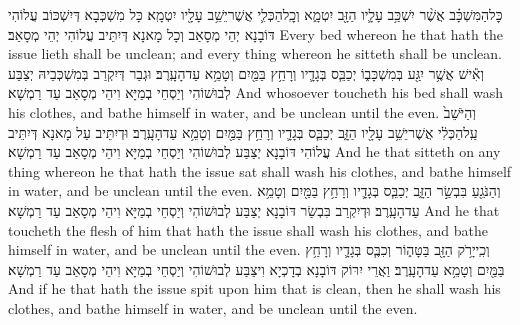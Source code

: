 {כׇּל\maqqaf הַמִּשְׁכָּ֗ב אֲשֶׁ֨ר יִשְׁכַּ֥ב עָלָ֛יו הַזָּ֖ב יִטְמָ֑א וְכׇֽל\maqqaf הַכְּלִ֛י אֲשֶׁר\maqqaf יֵשֵׁ֥ב עָלָ֖יו יִטְמָֽא׃}
{כָּל מִשְׁכְּבָא דְּיִשְׁכּוֹב עֲלוֹהִי דּוֹבָנָא יְהֵי מְסָאַב וְכָל מָאנָא דְּיִתֵּיב עֲלוֹהִי יְהֵי מְסָאַב׃}
{Every bed whereon he that hath the issue lieth shall be unclean; and every thing whereon he sitteth shall be unclean.}{}
{וְאִ֕ישׁ אֲשֶׁ֥ר יִגַּ֖ע בְּמִשְׁכָּב֑וֹ יְכַבֵּ֧ס בְּגָדָ֛יו וְרָחַ֥ץ בַּמַּ֖יִם וְטָמֵ֥א עַד\maqqaf הָעָֽרֶב׃}
{וּגְבַר דְּיִקְרַב בְּמִשְׁכְּבֵיהּ יְצַבַּע לְבוּשׁוֹהִי וְיַסְחֵי בְמַיָּא וִיהֵי מְסָאַב עַד רַמְשָׁא׃}
{And whosoever toucheth his bed shall wash his clothes, and bathe himself in water, and be unclean until the even.}{}
{וְהַיֹּשֵׁב֙ עַֽל\maqqaf הַכְּלִ֔י אֲשֶׁר\maqqaf יֵשֵׁ֥ב עָלָ֖יו הַזָּ֑ב יְכַבֵּ֧ס בְּגָדָ֛יו וְרָחַ֥ץ בַּמַּ֖יִם וְטָמֵ֥א עַד\maqqaf הָעָֽרֶב׃}
{וּדְיִתֵּיב עַל מָאנָא דְּיִתֵּיב עֲלוֹהִי דּוֹבָנָא יְצַבַּע לְבוּשׁוֹהִי וְיַסְחֵי בְמַיָּא וִיהֵי מְסָאַב עַד רַמְשָׁא׃}
{And he that sitteth on any thing whereon he that hath the issue sat shall wash his clothes, and bathe himself in water, and be unclean until the even.}{}
{וְהַנֹּגֵ֖עַ בִּבְשַׂ֣ר הַזָּ֑ב יְכַבֵּ֧ס בְּגָדָ֛יו וְרָחַ֥ץ בַּמַּ֖יִם וְטָמֵ֥א עַד\maqqaf הָעָֽרֶב׃}
{וּדְיִקְרַב בִּבְשַׂר דּוֹבָנָא יְצַבַּע לְבוּשׁוֹהִי וְיַסְחֵי בְמַיָּא וִיהֵי מְסָאַב עַד רַמְשָׁא׃}
{And he that toucheth the flesh of him that hath the issue shall wash his clothes, and bathe himself in water, and be unclean until the even.}{}
{וְכִֽי\maqqaf יָרֹ֥ק הַזָּ֖ב בַּטָּה֑וֹר וְכִבֶּ֧ס בְּגָדָ֛יו וְרָחַ֥ץ בַּמַּ֖יִם וְטָמֵ֥א עַד\maqqaf הָעָֽרֶב׃}
{וַאֲרֵי יִרּוֹק דּוֹבָנָא בְדָכְיָא וִיצַבַּע לְבוּשׁוֹהִי וְיַסְחֵי בְמַיָּא וִיהֵי מְסָאַב עַד רַמְשָׁא׃}
{And if he that hath the issue spit upon him that is clean, then he shall wash his clothes, and bathe himself in water, and be unclean until the even.}{}

